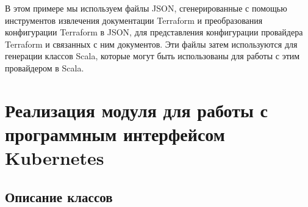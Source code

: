 В этом примере мы используем файлы JSON, сгенерированные с помощью инструментов
извлечения документации Terraform и преобразования конфигурации Terraform в
JSON, для представления конфигурации провайдера Terraform и связанных с ним
документов. Эти файлы затем используются для генерации классов Scala, которые
могут быть использованы для работы с этим провайдером в Scala.

\section{Реализация модуля для работы с программным интерфейсом Kubernetes}

\subsection{Описание классов}


